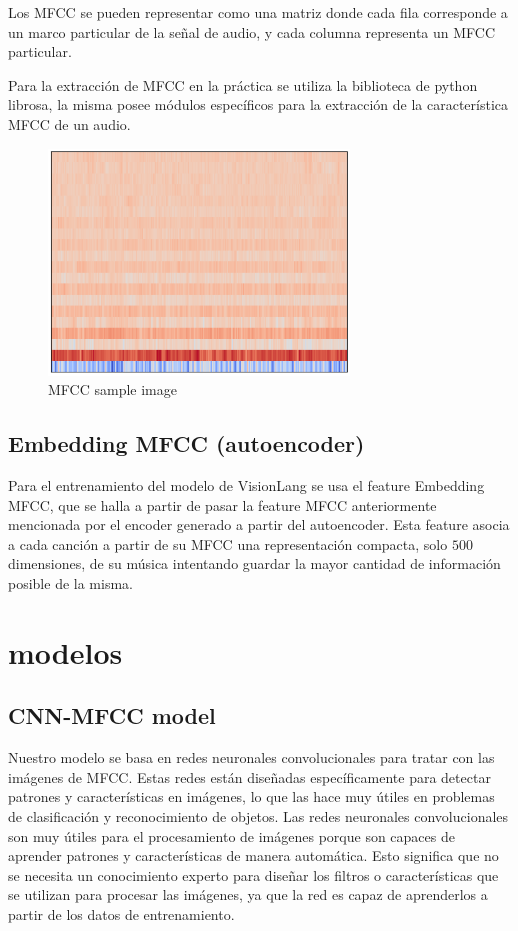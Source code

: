 \documentclass[colorinlistoftodos,twoside,twocolumn,10pt]{article} %
\begin{document}
Los MFCC se pueden representar como una matriz donde cada fila corresponde a un marco particular de la se\~nal de audio, y cada columna representa un MFCC particular.

Para la extracci\'on de MFCC en la pr\'actica se utiliza la biblioteca de python librosa, la misma posee m\'odulos espec\'ificos para la extracci\'on de la caracter\'istica MFCC de un audio.

\begin{figure}[h!] %
	\centering
	\includegraphics[width=8cm]{mfcc.png}
	\caption{MFCC sample image}
\end{figure}

\subsection {Embedding MFCC (autoencoder)}
Para el entrenamiento del modelo de VisionLang se usa el feature Embedding MFCC, que se halla a partir de pasar la feature MFCC anteriormente mencionada por el encoder generado a partir del autoencoder. Esta feature asocia a cada canci\'on a partir de su MFCC una representaci\'on compacta, solo $500$ dimensiones, de su m\'usica intentando guardar la mayor cantidad de informaci\'on posible de la misma.

\section{modelos}
\subsection {CNN-MFCC model}
Nuestro modelo se basa en redes neuronales convolucionales para tratar con las im\'agenes de MFCC. Estas redes est\'an dise\~nadas espec\'ificamente para detectar patrones y caracter\'isticas en im\'agenes, lo que las hace muy \'utiles en problemas de clasificaci\'on y reconocimiento de objetos. Las redes neuronales convolucionales son muy \'utiles para el procesamiento de im\'agenes porque son capaces de aprender patrones y caracter\'isticas de manera autom\'atica. Esto significa que no se necesita un conocimiento experto para dise\~nar los filtros o caracter\'isticas que se utilizan para procesar las im\'agenes, ya que la red es capaz de aprenderlos a partir de los datos de entrenamiento.
\end{document}
